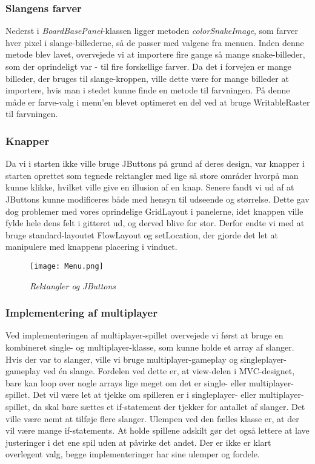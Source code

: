 \subsubsection{Slangens farver}
Nederst i \textit{BoardBasePanel}-klassen ligger metoden \textit{colorSnakeImage}, som farver hver pixel i slange-billederne, så de passer med valgene fra menuen. 
Inden denne metode blev lavet, overvejede vi at importere fire gange så mange snake-billeder, som der oprindeligt var - til fire forskellige farver. Da det i forvejen er mange billeder, der bruges til slange-kroppen, ville dette være for mange billeder at importere, hvis man i stedet kunne finde en metode til farvningen.
På denne måde er farve-valg i menu'en blevet optimeret en del ved at bruge WritableRaster til farvningen.

\subsubsection{Knapper}
Da vi i starten ikke ville bruge JButtons på grund af deres design, var knapper i starten oprettet som tegnede rektangler med lige så store områder hvorpå man kunne klikke, hvilket ville give en illusion af en knap. Senere fandt vi ud af at JButtons kunne modificeres både med hensyn til udseende og størrelse. Dette gav dog problemer med vores oprindelige GridLayout i panelerne, idet knappen ville fylde hele dens felt i gitteret ud, og derved  blive for stor. Derfor endte vi med at bruge standard-layoutet FlowLayout og setLocation, der gjorde det let at manipulere med knappens placering i vinduet.

\begin{figure}[h]
	\centering
	\texttt{[image: Menu.png]}
	\caption{\textit{Rektangler og JButtons}}
\end{figure}

\subsubsection{Implementering af multiplayer}
Ved implementeringen af multiplayer-spillet overvejede vi først at bruge en kombineret single- og multiplayer-klasse, som kunne holde et array af slanger. Hvis der var to slanger, ville vi bruge multiplayer-gameplay og singleplayer-gameplay ved én slange. Fordelen ved dette er, at view-delen i MVC-designet, bare kan loop over nogle arrays lige meget om det er single- eller multiplayer-spillet. Det vil være let at tjekke om spilleren er i singleplayer- eller multiplayer-spillet, da skal bare sættes et if-statement der tjekker for antallet af slanger. Det ville være nemt at tilføje flere slanger. Ulempen ved den fælles klasse er, at der vil være mange if-statements. At holde spillene adskilt gør det også lettere at lave justeringer i det ene spil uden at påvirke det andet. Der er ikke er klart overlegent valg, begge implementeringer har sine ulemper og fordele.